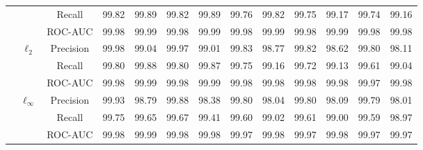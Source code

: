 \documentclass[conference]{IEEEtran}
\begin{document}
\begin{table}[h]
\begin{tabular}{|c|c|c|c|c|c|c|c|c|c|c|c|c|}
			& & Recall & \cellcolor{yellow!50}99.82 & 99.89 & \cellcolor{yellow!50}99.82 & 99.89 & \cellcolor{yellow!50}99.76 & 99.82 & \cellcolor{yellow!50}99.75 & 99.17 & \cellcolor{yellow!50}99.74 & 99.16 \\
			& & ROC-AUC & 99.98 & 99.99 & 99.98 & 99.99 & 99.98 & 99.99 & 99.98 & 99.99 & 99.98 & 99.98 \\
			\cline{2-13}
			& \multirow{3}{*}{\( \ell_2 \)} & Precision & 99.98 & \cellcolor{yellow!50}99.04 & 99.97 & \cellcolor{yellow!50}99.01 & 99.83 & \cellcolor{yellow!50}98.77 & 99.82 & \cellcolor{yellow!50}98.62 & 99.80 & \cellcolor{yellow!50}98.11 \\
			& & Recall & \cellcolor{yellow!50}99.80 & 99.88 & \cellcolor{yellow!50}99.80 & 99.87 & \cellcolor{yellow!50}99.75 & 99.16 & \cellcolor{yellow!50}99.72 & 99.13 & \cellcolor{yellow!50}99.61 & 99.04 \\
			& & ROC-AUC & 99.98 & 99.99 & 99.98 & 99.99 & 99.98 & 99.98 & 99.98 & 99.98 & \cellcolor{yellow!50}99.97 & \cellcolor{yellow!50}99.98 \\
			\cline{2-13}
			& \multirow{3}{*}{\( \ell_\infty \)} & Precision & 99.93 & \cellcolor{yellow!50}98.79 & 99.88 & \cellcolor{yellow!50}98.38 & \cellcolor{yellow!50}99.80 & \cellcolor{yellow!50}98.04 & \cellcolor{yellow!50}99.80 & \cellcolor{yellow!50}98.09 & \cellcolor{yellow!50}99.79 & \cellcolor{yellow!50}98.01 \\
			& & Recall & \cellcolor{yellow!50}99.75 & 99.65 & \cellcolor{yellow!50}99.67 & 99.41 & \cellcolor{yellow!50}99.60 & \cellcolor{yellow!50}99.02 & \cellcolor{yellow!50}99.61 & \cellcolor{yellow!50}99.00 & \cellcolor{yellow!50}99.59 & \cellcolor{yellow!50}98.97 \\
			& & ROC-AUC & 99.98 & \cellcolor{blue!20}99.99 & 99.98 & 99.98 & \cellcolor{yellow!50}99.97 & \cellcolor{yellow!50}99.98 & \cellcolor{yellow!50}99.97 & \cellcolor{yellow!50}99.98 & \cellcolor{yellow!50}99.97 & \cellcolor{yellow!50}99.97 \\
			\hline
		\end{tabular}
	\end{table}
	
\end{document}
